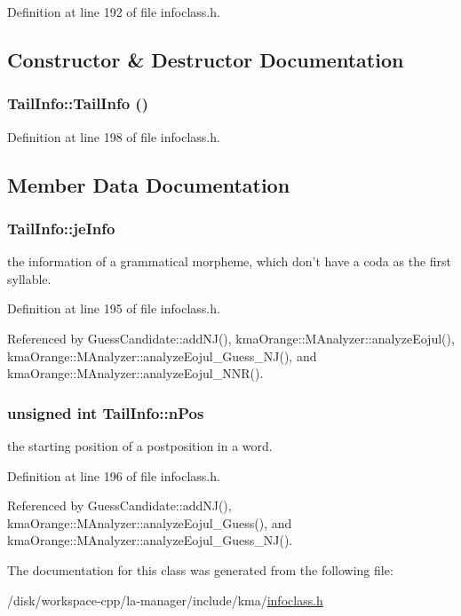 Definition at line 192 of file infoclass.h.

\subsection{Constructor \& Destructor Documentation}
\hypertarget{classTailInfo_09ea7a2c1c615f56597e0215ef8a89fa}{
\subsubsection[{TailInfo}]{\setlength{\rightskip}{0pt plus 5cm}TailInfo::TailInfo ()}}
\label{classTailInfo_09ea7a2c1c615f56597e0215ef8a89fa}




Definition at line 198 of file infoclass.h.

\subsection{Member Data Documentation}
\hypertarget{classTailInfo_5d3b2a9c5d301d40eb34f114db04c049}{
\subsubsection[{jeInfo}]{ {\bf TailInfo::jeInfo}}}
\label{classTailInfo_5d3b2a9c5d301d40eb34f114db04c049}


the information of a grammatical morpheme, which don't have a coda as the first syllable. 



Definition at line 195 of file infoclass.h.

Referenced by GuessCandidate::addNJ(), kmaOrange::MAnalyzer::analyzeEojul(), kmaOrange::MAnalyzer::analyzeEojul\_\-Guess\_\-NJ(), and kmaOrange::MAnalyzer::analyzeEojul\_\-NNR().\hypertarget{classTailInfo_d8fac4baca85f9538f5d6e0e97d0e78d}{
\subsubsection[{nPos}]{\setlength{\rightskip}{0pt plus 5cm}unsigned int {\bf TailInfo::nPos}}}
\label{classTailInfo_d8fac4baca85f9538f5d6e0e97d0e78d}


the starting position of a postposition in a word. 



Definition at line 196 of file infoclass.h.

Referenced by GuessCandidate::addNJ(), kmaOrange::MAnalyzer::analyzeEojul\_\-Guess(), and kmaOrange::MAnalyzer::analyzeEojul\_\-Guess\_\-NJ().

The documentation for this class was generated from the following file:\begin{CompactItemize}
\item 
/disk/workspace-cpp/la-manager/include/kma/\hyperlink{infoclass_8h}{infoclass.h}\end{CompactItemize}

